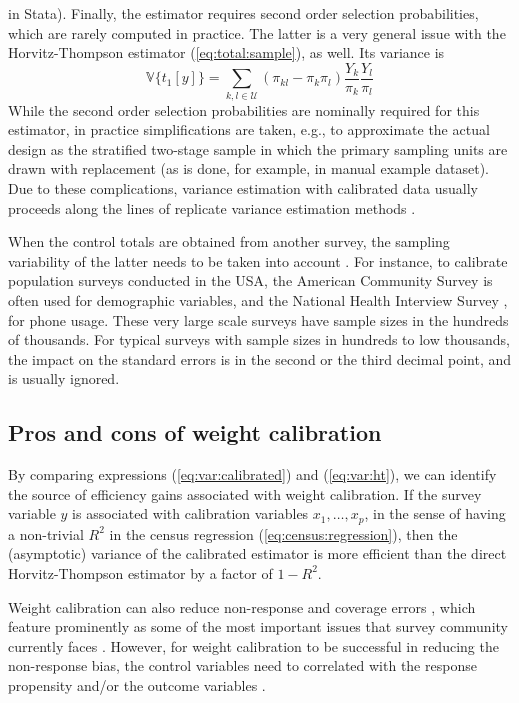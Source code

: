 in Stata). Finally, the estimator requires second order selection probabilities,
which are rarely computed in practice. The latter is a very general issue
with the Horvitz-Thompson estimator (\ref{eq:total:sample}), as well.
Its variance is
\begin{equation}
    \mathbb{V}\bigl\{t_{1}[y]\bigr\} = \sum_{k,l \in \mathcal{U}}
        (\pi_{kl}-\pi_k \pi_l)
        \frac{Y_k}{\pi_k}
        \frac{Y_l}{\pi_l}
    \label{eq:var:ht}
\end{equation}
While the second order selection probabilities are nominally required
for this estimator, in practice simplifications are taken, e.g.,
to approximate the actual design as the stratified two-stage sample
in which the primary sampling units are drawn with replacement
(as is done, for example, in  \svyref{} manual example
dataset). Due to these complications, variance estimation with
calibrated data usually proceeds along the lines of
replicate variance estimation methods \citep{shao:1996,kolenikov:2010}.

When the control totals are obtained from another survey,
the sampling variability of the latter needs to be taken
into account \citep{dever:valliant:2010}. For instance,
to calibrate population surveys conducted in the USA,
the American Community Survey \citep{acs:2009}
is often used for demographic variables,
and the National Health Interview Survey \citep{nhis:2000}, for phone usage.
These very large scale surveys have sample sizes in the hundreds of thousands.
For typical surveys with sample sizes in hundreds to low thousands,
the impact on the standard errors is in the second or the third
decimal point, and is usually ignored.


\subsection{Pros and cons of weight calibration}
\label{subsec:pro:con}

By comparing expressions (\ref{eq:var:calibrated}) and
(\ref{eq:var:ht}), we can identify the source of efficiency gains
associated with weight calibration. If the survey variable
$y$ is associated with calibration variables $x_1,\ldots,x_p$,
in the sense of having a non-trivial $R^2$ in the census regression
(\ref{eq:census:regression}),
then the (asymptotic) variance of the calibrated estimator is
more efficient than the direct Horvitz-Thompson estimator
by a factor of $1-R^2$.

Weight calibration can also reduce non-response
and coverage errors 
\citep{chang:kott:2008,kott:2006,lund:sarn:1999}, which
feature prominently as some of the most important issues 
that survey community currently faces \citep{groves:2006}.
However, for weight calibration to be successful in
reducing the non-response bias, the control variables
need to correlated with the response propensity and/or the outcome
variables \citep{bethlehem:2002,judkins:etal:2007}.

